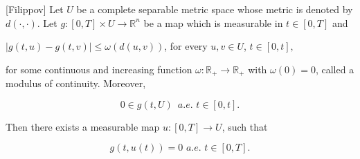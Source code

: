\begin{lemma}\label{FL}[Filippov]
	Let $U$ be a complete separable metric space whose metric is denoted by $d(\cdot,\cdot)$. Let $g:[0,T]\times U\rightarrow \mathbb{R}^n$ be a map which is measurable in $t\in[0,T]$ and
	
	\begin{center}
			$|g(t,u)-g(t,v)|\leq \omega(d(u,v))$, for every $u,v\in U$, $t\in [0,t],$
	\end{center}

	 for some continuous and increasing function $\omega:\mathbb{R}_{+}\rightarrow \mathbb{R}_{+}$ with $\omega(0)=0$, called a modulus of continuity. Moreover,
	 
	\begin{equation*}
	0\in g(t,U)\,\,\,a.e. \,\,t\in [0,t].
	\end{equation*}
	
	Then there exists a measurable map $u:[0,T]\rightarrow U$, such that 
	
	\begin{equation}\label{eq1.17}
	g(t,u(t))=0\,\, a.e.\,\, t\in [0,T].
	\end{equation}
	
\end{lemma}

